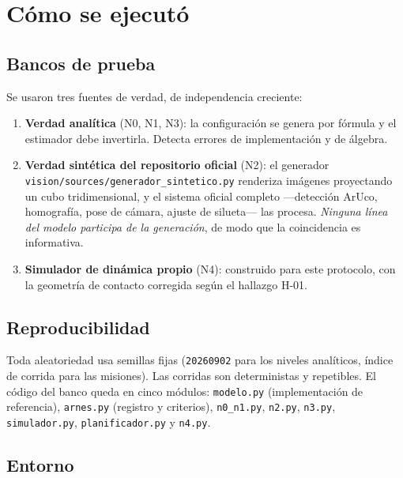 \documentclass[11pt,a4paper]{article}
\begin{document}
\section{Cómo se ejecutó}

\subsection{Bancos de prueba}

Se usaron tres fuentes de verdad, de independencia creciente:

\begin{enumerate}[label=\arabic*.,leftmargin=2.4em,itemsep=3pt]
\item \textbf{Verdad analítica} (N0, N1, N3): la configuración se genera por fórmula y
      el estimador debe invertirla. Detecta errores de implementación y de álgebra.
\item \textbf{Verdad sintética del repositorio oficial} (N2): el generador
      \texttt{vision/sources/generador\_sintetico.py} renderiza imágenes proyectando un
      cubo tridimensional, y el sistema oficial completo ---detección ArUco, homografía,
      pose de cámara, ajuste de silueta--- las procesa. \emph{Ninguna línea del modelo
      participa de la generación}, de modo que la coincidencia es informativa.
\item \textbf{Simulador de dinámica propio} (N4): construido para este protocolo, con la
      geometría de contacto corregida según el hallazgo H-01.
\end{enumerate}

\subsection{Reproducibilidad}

Toda aleatoriedad usa semillas fijas (\texttt{20260902} para los niveles analíticos,
índice de corrida para las misiones). Las corridas son deterministas y repetibles.
El código del banco queda en cinco módulos: \texttt{modelo.py} (implementación de
referencia), \texttt{arnes.py} (registro y criterios), \texttt{n0\_n1.py},
\texttt{n2.py}, \texttt{n3.py}, \texttt{simulador.py}, \texttt{planificador.py} y
\texttt{n4.py}.

\subsection{Entorno}
\end{document}
